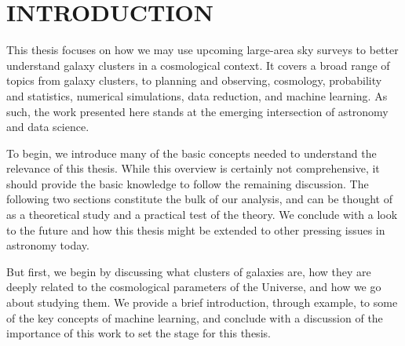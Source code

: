 %
%
%



\pagestyle{plain} %
\setcounter{page}{1}


\chapter[\uppercase{Introduction}]{\uppercase{Introduction}}

This thesis focuses on how we may use upcoming large-area sky surveys to better understand galaxy clusters in a cosmological context. It covers a broad range of topics from galaxy clusters, to planning and observing, cosmology, probability and statistics, numerical simulations, data reduction, and machine learning. As such, the work presented here stands at the emerging intersection of astronomy and data science.

To begin, we introduce many of the basic concepts needed to understand the relevance of this thesis. While this overview is certainly not comprehensive, it should provide the basic knowledge to follow the remaining discussion. The following two sections constitute the bulk of our analysis, and can be thought of as a theoretical study and a practical test of the theory. We conclude with a look to the future and how this thesis might be extended to other pressing issues in astronomy today.

But first, we begin by discussing what clusters of galaxies are, how they are deeply related to the cosmological parameters of the Universe, and how we go about studying them. We provide a brief introduction, through example, to some of the key concepts of machine learning, and conclude with a discussion of the importance of this work to set the stage for this thesis.

